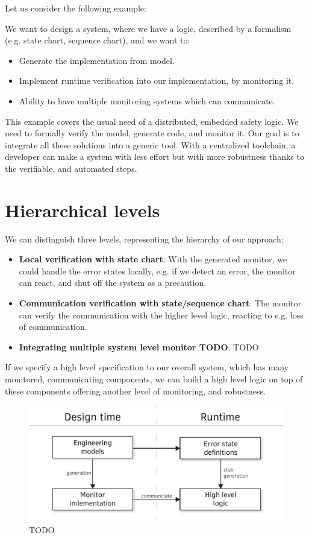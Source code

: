\noindent Let us consider the following example:

We want to design a system, where we have a logic, described by a formalism (e.g. state chart, sequence chart), and we want to:
\begin{itemize}
	\item Generate the implementation from model.
	\item Implement runtime verification into our implementation, by monitoring it.
	\item Ability to have multiple monitoring systems which can communicate.
\end{itemize}

This example covers the usual need of a distributed, embedded safety logic. We need to formally verify the model, generate code, and monitor it. Our goal is to integrate all these solutions into a generic tool. With a centralized toolchain, a developer can make a system with less effort but with more robustness thanks to the verifiable, and automated steps.
\\[1ex]

\section{Hierarchical levels}

We can distinguish three levels, representing the hierarchy of our approach:
\begin{itemize}
	\item \textbf{Local verification with state chart}: With the generated monitor, we could handle the error states locally, e.g. if we detect an error, the monitor can react, and shut off the system as a precaution.
	\item \textbf{Communication verification with state/sequence chart}: The monitor can verify the communication with the higher level logic, reacting to e.g. loss of communication.
	\item \textbf{Integrating multiple system level monitor TODO}: TODO
\end{itemize}

If we specify a high level specification to our overall system, which has many monitored, communicating components, we can build a high level logic on top of these components offering another level of monitoring, and robustness.

\begin{figure}[h]
	\centering
	\includegraphics[width=0.8\linewidth]{include/figures/chapter_3/abstract_diagram}
	\caption{TODO}
	\label{fig:overview:abstract_diagram}
\end{figure}

